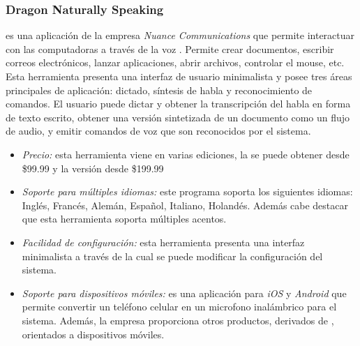 \subsubsection{Dragon Naturally Speaking}
\label{sec:nuance}

 es una aplicaci\'on de la empresa \emph{Nuance Communications} 
que permite interactuar con las computadoras a trav\'es de la voz \cite{DragonNaturallySpeaking}. Permite
crear documentos, escribir correos electr\'onicos, lanzar aplicaciones, abrir archivos, controlar
el mouse, etc. Esta herramienta presenta una interfaz de usuario minimalista y posee tres
\'areas principales de aplicaci\'on: dictado, s\'intesis de habla y reconocimiento de comandos. 
El usuario puede dictar y obtener la transcripci\'on del habla en forma de texto escrito, obtener
una versi\'on sintetizada de un documento como un flujo de audio, y emitir comandos de voz que
son reconocidos por el sistema.

\begin{itemize}
    \item \emph{Precio:} esta herramienta viene en varias ediciones, la  se puede
        obtener desde \$99.99 y la versi\'on  desde \$199.99
    \item \emph{Soporte para m\'ultiples idiomas:} este programa soporta los siguientes idiomas: Ingl\'es, Franc\'es,
	Alem\'an, Espa\~nol, Italiano, Holand\'es. Adem\'as cabe destacar que esta herramienta soporta 
    m\'ultiples acentos.
    \item \emph{Facilidad de configuraci\'on:} esta herramienta presenta una interfaz minimalista a 
    trav\'es de la cual se puede modificar la configuraci\'on del sistema.
    \item \emph{Soporte para dispositivos m\'oviles:}  es una aplicaci\'on para 
    \emph{iOS} y \emph{Android} que permite convertir un tel\'efono celular en un microfono inal\'ambrico 
    para el sistema. Adem\'as, la empresa  proporciona otros productos, 
    derivados de , orientados a dispositivos m\'oviles.
\end{itemize}
